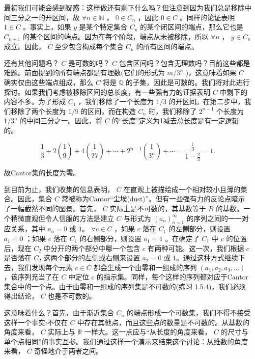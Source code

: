 最初我们可能会感到疑惑：这样做还有剩下什么吗？但注意到因为我们总是移除中间三分之一的开区间，故 \( \forall n \in  \mathbb{N}\) ， \(0 \in  {C}_{n}\) ，因此 \(0 \in  C\) 。同样的论证表明 \(1 \in  C\) 。事实上，如果 \(y\) 是某个特定集合 \({C}_{n}\) 的某个闭区间的端点，那么它也是 \({C}_{n + 1}\) 的某个区间的端点。因为在每个阶段，端点从未被移除，所以 \(\forall n\) ， \(y \in  {C}_{n}\) 成立。因此， \(C\) 至少包含构成每个集合 \({C}_{n}\) 的所有区间的端点。

还有其他问题吗？ \(C\) 是可数的吗？ \(C\) 包含区间吗？包含无理数吗？目前这些都是难题。前面提到的所有端点都是有理数(它们的形式为 \(m/{3}^{n}\) )，这意味着如果 \(C\) 确实仅由这些端点组成，那么 \(C\) 将是 \(\mathbb{Q}\) 的子集，因此是可数的。我们将对此进行探讨。如果我们考虑被移除区间的总长度，有一些强有力的证据表明 \(C\) 中剩下的内容不多。为了形成 \({C}_{1}\) ，我们移除了一个长度为 \(1/3\) 的开区间。在第二步中，我们移除了两个长度为 \(1/9\) 的区间，而在构造 \({C}_{n}\) 时，我们移除了 \({2}^{n - 1}\) 个长度为 \(1/{3}^{n}\) 的中间三分之一。因此，将 \(C\) 的“长度”定义为1减去总长度是有一定逻辑的。

\[
\frac{1}{3} + 2\left( \frac{1}{9}\right)  + 4\left( \frac{1}{27}\right)  + \cdots  + {2}^{n - 1}\left( \frac{1}{{3}^{n}}\right)  + \cdots  = \frac{\frac{1}{3}}{1 - \frac{2}{3}} = 1.
\]

故Cantor集的长度为零。

到目前为止，我们收集的信息表明， \(C\) 在直观上被描绘成一个相对较小且薄的集合。因此，集合 \(C\) 常被称为Cantor“尘埃(dust)”。但有一些强有力的反论点暗示了一幅截然不同的图景。首先， \(C\) 实际上是不可数的，其基数等于 \(R\) 的基数。一个稍微直观但令人信服的方法是建立 \(C\) 与形式为 \({\left( {a}_{n}\right) }_{n = 1}^{\infty }\) 的序列之间的一一对应关系，其中 \({a}_{n} = 0\) 或 $1$。 \(\forall c \in  C\) ，如果 \(c\) 落在 \({C}_{1}\) 的左侧部分，则设置 \({a}_{1} = 0\) ；如果 \(c\) 落在 \({C}_{1}\) 的右侧部分，则设置 \({a}_{1} = 1\) 。在确定了 \({C}_{1}\) 中 \(c\) 的位置后，现在 \({C}_{2}\) 中分开的两个部分中哪一个包含 $c$ 有两种可能。这一次，我们根据 \(c\) 是否落在 \({C}_{2}\) 这两个部分的左侧或右侧来设置 \({a}_{2} = 0\) 或 $1$。通过这种方式继续下去，我们发现每个元素 \(c \in  C\) 都会生成一个由零和一组成的序列 \(\left( {{a}_{1},{a}_{2},{a}_{3},\ldots }\right)\) ，该序列充当了在 \(C\) 中定位 \(c\) 的指示集。同样，每个这样的序列都对应于Cantor集合中的一个点。由于由零和一组成的序列集是不可数的(练习 1.5.4)，我们必须得出结论， \(C\) 也是不可数的。


这意味着什么？首先，由于渐近集合 \({C}_{n}\) 的端点形成一个可数集，我们不得不接受这样一个事实:不仅在 \(C\) 中存在其他点，而且这些点的数量是不可数的。从基数的角度来看， \(C\) 实际上与 \(\mathbb{R}\) 一样大。这一点应与“从长度的角度来看， \(C\) 的尺寸与单个点相同”的事实互参。我们通过这样一个演示来结束这个讨论：从维数的角度来看， \(C\) 奇怪地介于两者之间。

